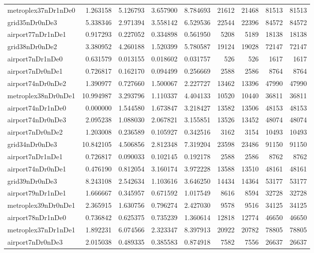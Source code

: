 \begin{longtable}{|l|r|r|r|r|r|r|r|r|}
metroplex37nDr1nDe0 & 1.263158 & 5.126793 & 3.657900 & 8.784693 & 21612 & 21468 & 81513 & 81513 \\
grid35nDr0nDe3 & 5.338346 & 2.971394 & 3.558142 & 6.529536 & 22544 & 22396 & 84572 & 84572 \\
airport77nDr1nDe1 & 0.917293 & 0.227052 & 0.334898 & 0.561950 & 5208 & 5189 & 18138 & 18138 \\
grid38nDr0nDe2 & 3.380952 & 4.260188 & 1.520399 & 5.780587 & 19124 & 19028 & 72147 & 72147 \\
airport7nDr1nDe0 & 0.631579 & 0.013155 & 0.018602 & 0.031757 & 526 & 526 & 1617 & 1617 \\
airport7nDr0nDe1 & 0.726817 & 0.162170 & 0.094499 & 0.256669 & 2588 & 2586 & 8764 & 8764 \\
airport74nDr0nDe2 & 1.390977 & 0.727660 & 1.500067 & 2.227727 & 13462 & 13396 & 47990 & 47990 \\
metroplex38nDr0nDe1 & 10.994987 & 3.293796 & 1.110337 & 4.404133 & 10520 & 10440 & 36811 & 36811 \\
airport74nDr1nDe0 & 0.000000 & 1.544580 & 1.673847 & 3.218427 & 13582 & 13506 & 48153 & 48153 \\
airport74nDr0nDe3 & 2.095238 & 1.088030 & 2.067821 & 3.155851 & 13526 & 13452 & 48074 & 48074 \\
airport7nDr0nDe2 & 1.203008 & 0.236589 & 0.105927 & 0.342516 & 3162 & 3154 & 10493 & 10493 \\
grid34nDr0nDe3 & 10.842105 & 4.506856 & 2.812348 & 7.319204 & 23598 & 23486 & 91150 & 91150 \\
airport7nDr1nDe1 & 0.726817 & 0.090033 & 0.102145 & 0.192178 & 2588 & 2586 & 8762 & 8762 \\
airport74nDr0nDe1 & 0.476190 & 0.812054 & 3.160174 & 3.972228 & 13588 & 13510 & 48161 & 48161 \\
grid39nDr0nDe3 & 8.243108 & 2.542634 & 1.103616 & 3.646250 & 14434 & 14364 & 53177 & 53177 \\
airport79nDr1nDe1 & 1.666667 & 0.345957 & 0.671592 & 1.017549 & 8616 & 8594 & 32728 & 32728 \\
metroplex39nDr0nDe1 & 2.365915 & 1.630756 & 0.796274 & 2.427030 & 9578 & 9516 & 34125 & 34125 \\
airport78nDr1nDe0 & 0.736842 & 0.625375 & 0.735239 & 1.360614 & 12818 & 12774 & 46650 & 46650 \\
metroplex37nDr1nDe1 & 1.892231 & 6.074566 & 2.323347 & 8.397913 & 20922 & 20782 & 78805 & 78805 \\
airport7nDr0nDe3 & 2.015038 & 0.489335 & 0.385583 & 0.874918 & 7582 & 7556 & 26637 & 26637 \\

\end{longtable}
